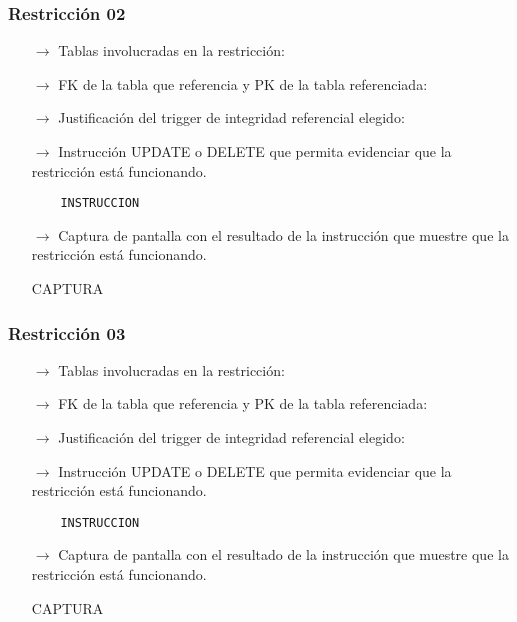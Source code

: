 \subsubsection*{Restricción 02}

\begin{itemize}
    \item[$\rightarrow$] Tablas involucradas en la restricción: 
    \item[$\rightarrow$] FK de la tabla que referencia y PK de la tabla referenciada: 
    \item[$\rightarrow$] Justificación del trigger de integridad referencial elegido: 
    \item[$\rightarrow$] Instrucción UPDATE o DELETE que permita evidenciar que la restricción está
    funcionando.
    \begin{verbatim}
    INSTRUCCION
    \end{verbatim}
    \item[$\rightarrow$] Captura de pantalla con el resultado de la instrucción que muestre que la restricción está
    funcionando.
    \begin{center}
        CAPTURA
    \end{center}
\end{itemize}

\subsubsection*{Restricción 03}

\begin{itemize}
    \item[$\rightarrow$] Tablas involucradas en la restricción: 
    \item[$\rightarrow$] FK de la tabla que referencia y PK de la tabla referenciada: 
    \item[$\rightarrow$] Justificación del trigger de integridad referencial elegido: 
    \item[$\rightarrow$] Instrucción UPDATE o DELETE que permita evidenciar que la restricción está
    funcionando.
    \begin{verbatim}
    INSTRUCCION
    \end{verbatim}
    \item[$\rightarrow$] Captura de pantalla con el resultado de la instrucción que muestre que la restricción está
    funcionando.
    \begin{center}
        CAPTURA
    \end{center}
\end{itemize}

